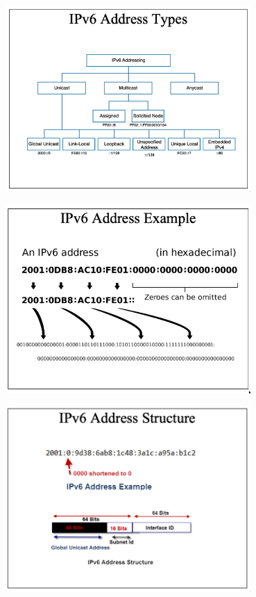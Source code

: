\documentclass[11pt]{article}
\begin{document}
\begin{center}
    \includegraphics[width=0.7\textwidth]{ipv6addresstypes.png}
\end{center}

\begin{center}
    \includegraphics[width=0.7\textwidth]{ipv6addressexample.png}
\end{center}

\begin{center}
    \includegraphics[width=0.7\textwidth]{ipv6addressstructure.png}
\end{center}
\end{document}

